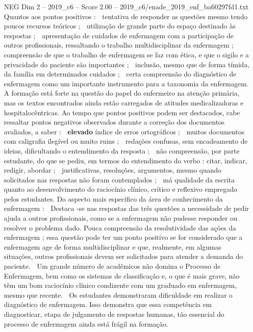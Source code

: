 \begin{textsample}{NEG Dim 2 – 2019\_c6 – Score 2.00 – 2019\_c6/enade\_2019\_enf\_ba60297fd1.txt}
Quantos aos pontos positivos :  tentativa de responder as questões mesmo tendo poucos recursos teóricos ;  utilização de grande parte do espaço destinado às respostas ;  apresentação de cuidados de enfermagem com a participação de outros profissionais, ressaltando o trabalho multidisciplinar da enfermagem ;  compreensão de que o trabalho de enfermagem se faz com ética, e que o sigilo e a privacidade do paciente são importantes ;  inclusão, mesmo que de forma tímida, da família em determinados cuidados ;  certa compreensão do diagnóstico de enfermagem como um importante instrumento para a taxonomia da enfermagem.
A formação está forte na questão do papel do enfermeiro na atenção primária, mas os textos encontrados ainda estão carregados de atitudes medicalizadoras e hospitalocêntricas.
Ao tempo que pontos positivos podem ser destacados, cabe ressaltar pontos negativos observados durante a correção dos documentos avaliados, a saber :  \textbf{elevado} índice de erros ortográficos ;  muitos documentos com caligrafia ilegível ou muito ruins ;  redações confusas, sem encadeamento de ideias, dificultando o entendimento da resposta ;  não compreensão, por parte estudante, do que se pediu, em termos do entendimento do verbo : citar, indicar, redigir, abordar ;  justificativas, resoluções, argumentos, mesmo quando solicitados nas respostas não foram contemplados ;  má qualidade da escrita quanto ao desenvolvimento do raciocínio clínico, crítico e reflexivo empregado pelos estudantes.
Do aspecto mais específico da área de conhecimento da enfermagem :  Destaca -se nas respostas das três questões a necessidade de pedir ajuda a outros profissionais, como se a enfermagem não pudesse responder ou resolver o problema dado.
Pouca compreensão da resolutividade das ações da enfermagem ; essa questão pode ter um ponto positivo se for considerado que a enfermagem age de forma multidisciplinar e que, realmente, em algumas situações, outros profissionais devem ser solicitados para atender a demanda do paciente.  Um grande número de acadêmicos não domina o Processo de Enfermagem, bem como os sistemas de classificação e, o que é mais grave, não têm um bom raciocínio clínico condizente com um graduado em enfermagem, mesmo que recente.  Os estudantes demonstraram dificuldade em realizar o diagnóstico de enfermagem.
Isso demonstra que essa competência em diagnosticar, etapa de julgamento de respostas humanas, tão essencial do processo de enfermagem ainda está frágil na formação.

\end{textsample}
